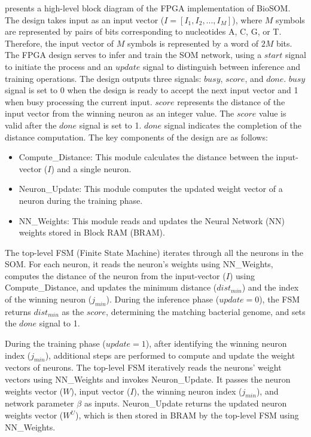  presents a high-level block diagram of the FPGA implementation of BioSOM. The design takes input as an input vector ($I = [I_1, I_2, ..., I_M]$), where $M$ symbols are represented by pairs of bits corresponding to nucleotides A, C, G, or T. Therefore, the input vector of $M$ symbols is represented by a word of $2M$ bits. The FPGA design serves to infer and train the SOM network, using a $start$ signal to initiate the process and an $update$ signal to distinguish between inference and training operations. The design outputs three signals: $busy$, $score$, and $done$.
$busy$ signal is set to 0 when the design is ready to accept the next input vector and 1 when busy processing the current input. $score$ represents the distance of the input vector from the winning neuron as an integer value. The $score$ value is valid after the $done$ signal is set to 1. $done$ signal indicates the completion of the distance computation. The key components of the design are as follows:
\begin{itemize}
	\item Compute\_Distance: This module calculates the distance between the input-vector ($I$) and a single neuron.
	\item Neuron\_Update: This module computes the updated weight vector of a neuron during the training phase.
	\item NN\_Weights: This module reads and updates the Neural Network (NN) weights stored in Block RAM (BRAM).
\end{itemize}
The top-level FSM (Finite State Machine) iterates through all the neurons in the SOM. For each neuron, it reads the neuron's weights using NN\_Weights, computes the distance of the neuron from the input-vector ($I$) using Compute\_Distance, and updates the minimum distance ($dist_{min}$) and the index of the winning neuron ($j_{min}$). During the inference phase ($update{=}0$), the FSM returns $dist_{min}$ as the $score$, determining the matching bacterial genome, and sets the $done$ signal to 1.

During the training phase ($update{=}1$), after identifying the winning neuron index ($j_{min}$), additional steps are performed to compute and update the weight vectors of neurons. The top-level FSM iteratively reads the neurons' weight vectors using NN\_Weights and invokes Neuron\_Update. It passes the neuron weights vector ($W$), input vector ($I$), the winning neuron index ($j_{min}$), and network parameter $\beta$ as inputs. Neuron\_Update returns the updated neuron weights vector ($W^U$), which is then stored in BRAM by the top-level FSM using NN\_Weights.

